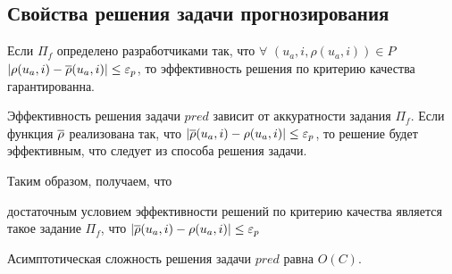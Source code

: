 
\subsection{Свойства решения задачи прогнозирования}

\begin{trm}
	\label{pif_acc_pred}
	Если $\Pi_f$ определено разработчиками так, что $\forall$ $(u_a, i, \rho(u_a, i)) \in P$
	$|\rho(u_a, i) - \overline{\rho}(u_a, i)| \le \varepsilon_p$, то эффективность решения
	по критерию качества гарантированна.
\end{trm}

Эффективность решения задачи $pred$ зависит от
аккуратности задания $\Pi_f$.
Если функция $\overline{\rho}$ реализована так, что
$|\overline{\rho}(u_a, i) - \rho(u_a, i)| \le \varepsilon_p$, то решение будет эффективным,
что следует из способа решения задачи.

Таким образом, получаем, что
\begin{trm}
	\label{fuz-cond-pred}
достаточным условием эффективности решений по критерию качества является
такое задание $\Pi_f$, что
$|\overline{\rho}(u_a, i) - \rho(u_a, i)| \le \varepsilon_p$
\end{trm}

Асимптотическая сложность решения задачи $pred$ равна $O(C)$.
%




